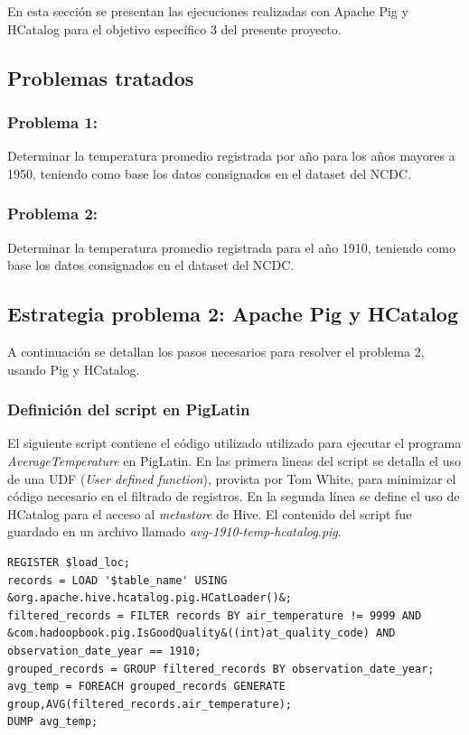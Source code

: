 En esta sección se presentan las ejecuciones realizadas con Apache Pig y HCatalog para el objetivo específico 3 del presente proyecto. \\

\subsection{Problemas tratados}

\subsubsection{Problema 1:} Determinar la temperatura promedio registrada por año para los años mayores a 1950, teniendo como base los datos consignados en el dataset del NCDC.

\subsubsection{Problema 2:} Determinar la temperatura promedio registrada para el año 1910, teniendo como base los datos consignados en el dataset del NCDC.

\subsection{Estrategia problema 2: Apache Pig y HCatalog}

A continuación se detallan los pasos necesarios para resolver el problema 2, usando Pig y HCatalog. \\

\subsubsection{Definición del script en PigLatin}

El siguiente script contiene el código utilizado utilizado para ejecutar el programa \textit{AverageTemperature} en PigLatin. En las primera lineas del script se detalla el uso de una UDF (\textit{User defined function}), provista por Tom White, para minimizar el código necesario en el filtrado de registros. En la segunda línea se define el uso de HCatalog para el acceso al \textit{metastore} de Hive. El contenido del script fue guardado en un archivo llamado \textit{avg-1910-temp-hcatalog.pig}.

\begin{lstlisting}[linewidth=\columnwidth,breaklines=true]
REGISTER $load_loc;
records = LOAD '$table_name' USING &org.apache.hive.hcatalog.pig.HCatLoader()&;
filtered_records = FILTER records BY air_temperature != 9999 AND &com.hadoopbook.pig.IsGoodQuality&((int)at_quality_code) AND observation_date_year == 1910; 
grouped_records = GROUP filtered_records BY observation_date_year; 
avg_temp = FOREACH grouped_records GENERATE group,AVG(filtered_records.air_temperature); 
DUMP avg_temp;  
\end{lstlisting} 


